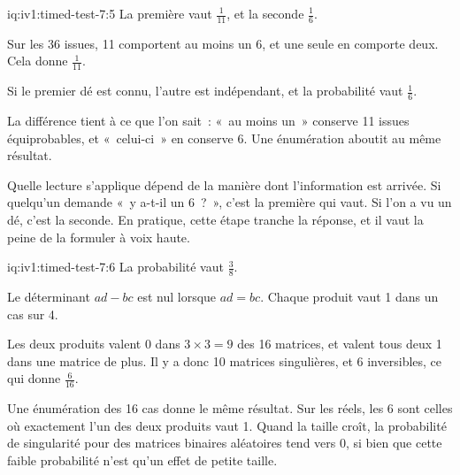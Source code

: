\begin{solution}{iq:iv1:timed-test-7:5}
La première vaut $\frac{1}{11}$, et la seconde $\frac16$.

Sur les 36 issues, 11 comportent au moins un 6, et une seule en comporte deux. Cela donne $\frac{1}{11}$.

Si le premier dé est connu, l'autre est indépendant, et la probabilité vaut $\frac16$.

La différence tient à ce que l'on sait~: «~au moins un~» conserve 11 issues équiprobables, et «~celui-ci~» en conserve 6. Une énumération aboutit au même résultat.

Quelle lecture s'applique dépend de la manière dont l'information est arrivée. Si quelqu'un demande «~y a-t-il un 6~?~», c'est la première qui vaut. Si l'on a vu un dé, c'est la seconde. En pratique, cette étape tranche la réponse, et il vaut la peine de la formuler à voix haute.

\end{solution}

\begin{solution}{iq:iv1:timed-test-7:6}
La probabilité vaut $\frac38$.

Le déterminant $ad - bc$ est nul lorsque $ad = bc$. Chaque produit vaut 1 dans un cas sur 4.

Les deux produits valent 0 dans $3 \times 3 = 9$ des 16 matrices, et valent tous deux 1 dans une matrice de plus. Il y a donc 10 matrices singulières, et 6 inversibles, ce qui donne $\frac{6}{16}$.

Une énumération des 16 cas donne le même résultat. Sur les réels, les 6 sont celles où exactement l'un des deux produits vaut 1. Quand la taille croît, la probabilité de singularité pour des matrices binaires aléatoires tend vers 0, si bien que cette faible probabilité n'est qu'un effet de petite taille.

\end{solution}

